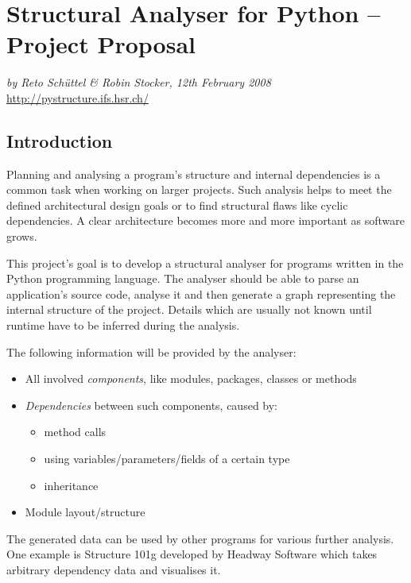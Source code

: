 \documentclass[12pt,halfparskip]{scrartcl}
\begin{document}
\pagestyle{plain}

\section*{Structural Analyser for Python – Project Proposal}
\vspace{-0.5cm}

\emph{by Reto Schüttel \& Robin Stocker, 12th February 2008}\\
\url{http://pystructure.ifs.hsr.ch/}

\vspace{-0.3cm}

\subsection*{Introduction}

Planning and analysing a program's structure and internal dependencies is a common task when working on larger projects. Such analysis helps to meet the defined architectural design goals or to find structural flaws like cyclic dependencies. A clear architecture becomes more and more important as software grows.

This project's goal is to develop a structural analyser for programs written in the Python programming language. The analyser should be able to parse an application's source code, analyse it and then generate a graph representing the internal structure of the project. Details which are usually not known until runtime have to be inferred during the analysis.

The following information will be provided by the analyser: 
\begin{itemize}
	\item All involved \emph{components}, like modules, packages, classes or methods
	\item \emph{Dependencies} between such components, caused by:
	\begin{itemize}
		\item method calls
		\item using variables/parameters/fields of a certain type
		\item inheritance
	\end{itemize}
	\item Module layout/structure
\end{itemize}

The generated data can be used by other programs for various further analysis. One example is Structure 101g developed by Headway Software which takes arbitrary dependency data and visualises it. 
\end{document}
